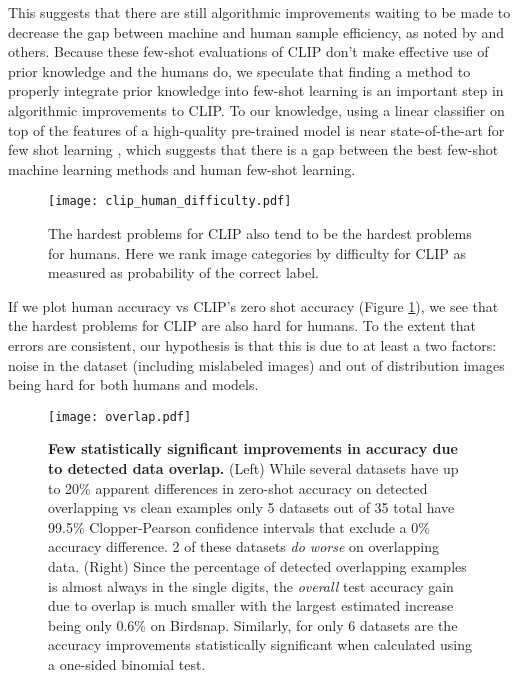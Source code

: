 \documentclass{article}
\begin{document}
This suggests that there are still algorithmic improvements waiting to be made to decrease the gap between machine and human sample efficiency, as noted by \citet{lake2016building} and others. Because these few-shot evaluations of CLIP don't make effective use of prior knowledge and the humans do, we speculate that finding a method to properly integrate prior knowledge into few-shot learning is an important step in algorithmic improvements to CLIP. To our knowledge, using a linear classifier on top of the features of a high-quality pre-trained model is near state-of-the-art for few shot learning \citep{tian2020rethinking}, which suggests that there is a gap between the best few-shot machine learning methods and human few-shot learning.

\begin{figure}[t]
\begin{center}
\centerline{\texttt{[image: clip\_human\_difficulty.pdf]}}
\caption{The hardest problems for CLIP also tend to be the hardest problems for humans. Here we rank image categories by difficulty for CLIP as measured as probability of the correct label.}
\label{clip_human_difficulty_fig}
\end{center}
\end{figure}

If we plot human accuracy vs CLIP’s zero shot accuracy (Figure \ref{clip_human_difficulty_fig}), we see that the hardest problems for CLIP are also hard for humans. To the extent that errors are consistent, our hypothesis is that this is due to at least a two factors: noise in the dataset (including mislabeled images) and out of distribution images being hard for both humans and models.

\begin{figure*}[ht]
\begin{center}
\centerline{\texttt{[image: overlap.pdf]}}
\caption{\textbf{Few statistically significant improvements in accuracy due to detected data overlap.} (Left) While several datasets have up to 20\% apparent differences in zero-shot accuracy on detected overlapping vs clean examples only 5 datasets out of 35 total have 99.5\% Clopper-Pearson confidence intervals that exclude a 0\% accuracy difference. 2 of these datasets \textit{do worse} on overlapping data. (Right) Since the percentage of detected overlapping examples is almost always in the single digits, the \textit{overall} test accuracy gain due to overlap is much smaller with the largest estimated increase being only 0.6\% on Birdsnap. Similarly, for only 6 datasets are the accuracy improvements statistically significant when calculated using a one-sided binomial test.}
\label{overlap_fig}
\end{center}
\end{figure*}
\end{document}
